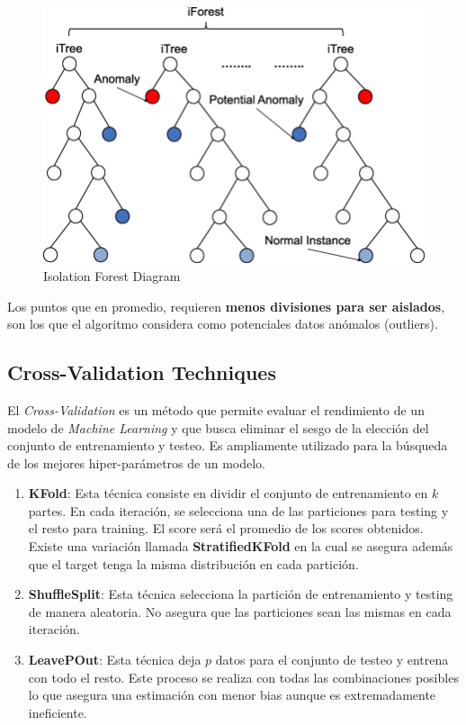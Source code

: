 \begin{figure}[H]
    \center
    \includegraphics[scale=0.3]{notebooks/Others/img/isolation_forest_diagram.png}
    \caption{Isolation Forest Diagram}
\end{figure}

Los puntos que en promedio, requieren \textbf{menos divisiones para ser aislados}, son los que el algoritmo considera como potenciales datos anómalos (outliers).

\subsection{Cross-Validation Techniques}

El \textit{Cross-Validation} es un método que permite evaluar el rendimiento de un modelo de \textit{Machine Learning} y que busca eliminar el sesgo de la elección del conjunto de entrenamiento y testeo. Es ampliamente utilizado para la búsqueda de los mejores hiper-parámetros de un modelo. 


\begin{enumerate}
    \item \textbf{KFold}: Esta técnica consiste en dividir el conjunto de entrenamiento en $k$ partes. En cada iteración, se selecciona una de las particiones para testing y el resto para training. El score será el promedio de los scores obtenidos. Existe una variación llamada \textbf{StratifiedKFold} en la cual se asegura además que el target tenga la misma distribución en cada partición.
    \item \textbf{ShuffleSplit}: Esta técnica selecciona la partición de entrenamiento y testing de manera aleatoria. No asegura que las particiones sean las mismas en cada iteración. 
    \item \textbf{LeavePOut}: Esta técnica deja $p$ datos para el conjunto de testeo y entrena con todo el resto. Este proceso se realiza con todas las combinaciones posibles lo que asegura una estimación con menor bias aunque es extremadamente ineficiente. 
\end{enumerate}

